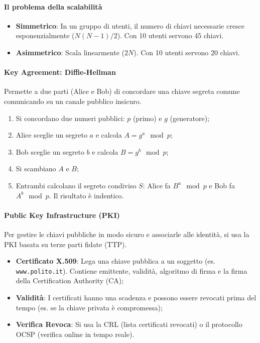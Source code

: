 \paragraph{Il problema della scalabilità}
\begin{itemize}
    \item \textbf{Simmetrico}: In un gruppo di utenti, il numero di chiavi necessarie cresce esponenzialmente ($N(N-1)/2$). Con 10 utenti servono 45 chiavi.
    \item \textbf{Asimmetrico}: Scala linearmente ($2N$). Con 10 utenti servono 20 chiavi.
\end{itemize}

%
\paragraph{Key Agreement: Diffie-Hellman} Permette a due parti (Alice e Bob) di concordare una chiave segreta comune comunicando su un canale pubblico insicuro.
\begin{enumerate}
    \item Si concordano due numeri pubblici: $p$ (primo) e $g$ (generatore);
    \item Alice sceglie un segreto $a$ e calcola $A = g^a \mod p$;
    \item Bob sceglie un segreto $b$ e calcola $B = g^b \mod p$;
    \item Si scambiano $A$ e $B$;
    \item Entrambi calcolano il segreto condiviso $S$: Alice fa $B^a \mod p$ e Bob fa $ A^b \mod p$. Il risultato è indentico.
\end{enumerate}

%
\paragraph{Public Key Infrastructure (PKI)} Per gestire le chiavi pubbliche in modo sicuro e associarle alle identità, si usa la PKI basata su terze parti fidate (TTP).
\begin{itemize}
    \item \textbf{Certificato X.509}: Lega una chiave pubblica a un soggetto (es. \verb|www.polito.it|). Contiene emittente, validità, algoritmo di firma e la firma della Certification Authority (CA);
    \item \textbf{Validità}: I certificati hanno una scadenza e possono essere revocati prima del tempo (es. se la chiave privata è compromessa);
    \item \textbf{Verifica Revoca}: Si usa la CRL (lista certificati revocati) o il protocollo OCSP (verifica online in tempo reale).
\end{itemize}

